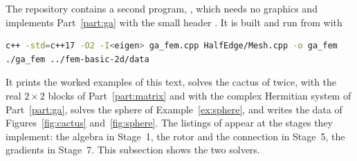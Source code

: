 The repository contains a second program, , which needs no graphics and implements Part~\ref{part:ga} with the small header . It is built and run from  with
\begin{lstlisting}[language=bash, numbers=none]
c++ -std=c++17 -O2 -I<eigen> ga_fem.cpp HalfEdge/Mesh.cpp -o ga_fem
./ga_fem ../fem-basic-2d/data
\end{lstlisting}
It prints the worked examples of this text, solves the cactus of  twice, with the real $2 \times 2$ blocks of Part~\ref{part:matrix} and with the complex Hermitian system of Part~\ref{part:ga}, solves the sphere of Example~\ref{ex:sphere}, and writes the data of Figures~\ref{fig:cactus} and~\ref{fig:sphere}. The listings of  appear at the stages they implement: the algebra in Stage~1, the rotor and the connection in Stage~5, the gradients in Stage~7. This subsection shows the two solvers.

